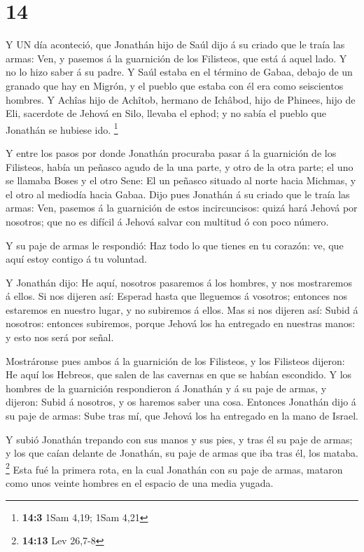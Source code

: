 \hypertarget{section-13}{%
\section{14}\label{section-13}}

 Y UN día aconteció, que Jonathán hijo de Saúl dijo á su
criado que le traía las armas: Ven, y pasemos á la guarnición de los
Filisteos, que está á aquel lado. Y no lo hizo saber á su padre.
 Y Saúl estaba en el término de Gabaa, debajo de un granado
que hay en Migrón, y el pueblo que estaba con él era como seiscientos
hombres.  Y Achîas hijo de Achîtob, hermano de Ichâbod, hijo
de Phinees, hijo de Eli, sacerdote de Jehová en Silo, llevaba el ephod;
y no sabía el pueblo que Jonathán se hubiese ido. \footnote{\textbf{14:3}
  1Sam 4,19; 1Sam 4,21}

 Y entre los pasos por donde Jonathán procuraba pasar á la
guarnición de los Filisteos, había un peñasco agudo de la una parte, y
otro de la otra parte; el uno se llamaba Boses y el otro Sene:
 El un peñasco situado al norte hacia Michmas, y el otro al
mediodía hacia Gabaa.  Dijo pues Jonathán á su criado que le
traía las armas: Ven, pasemos á la guarnición de estos incircuncisos:
quizá hará Jehová por nosotros; que no es difícil á Jehová salvar con
multitud ó con poco número.

 Y su paje de armas le respondió: Haz todo lo que tienes en
tu corazón: ve, que aquí estoy contigo á tu voluntad.

 Y Jonathán dijo: He aquí, nosotros pasaremos á los hombres,
y nos mostraremos á ellos.  Si nos dijeren así: Esperad
hasta que lleguemos á vosotros; entonces nos estaremos en nuestro lugar,
y no subiremos á ellos.  Mas si nos dijeren así: Subid á
nosotros: entonces subiremos, porque Jehová los ha entregado en nuestras
manos: y esto nos será por señal.

 Mostráronse pues ambos á la guarnición de los Filisteos, y
los Filisteos dijeron: He aquí los Hebreos, que salen de las cavernas en
que se habían escondido.  Y los hombres de la guarnición
respondieron á Jonathán y á su paje de armas, y dijeron: Subid á
nosotros, y os haremos saber una cosa. Entonces Jonathán dijo á su paje
de armas: Sube tras mí, que Jehová los ha entregado en la mano de
Israel.

 Y subió Jonathán trepando con sus manos y sus pies, y tras
él su paje de armas; y los que caían delante de Jonathán, su paje de
armas que iba tras él, los mataba. \footnote{\textbf{14:13} Lev 26,7-8}
 Esta fué la primera rota, en la cual Jonathán con su paje
de armas, mataron como unos veinte hombres en el espacio de una media
yugada.

